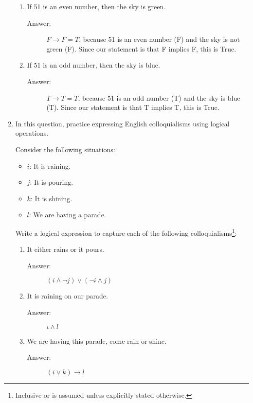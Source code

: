 \documentclass[12pt, oneside]{article}
\begin{document}
\begin{enumerate}
\begin{enumerate}
    \item If 51 is an even number, then the sky is green.
    \begin{description}
        \item[Answer:] $F \rightarrow F = T$, because 51 is an even number (F) and the sky is not green (F). Since our statement is that F implies F, this is True.
    \end{description}
    \item If 51 is an odd number, then the sky is blue.
    \begin{description}
        \item[Answer:] $T \rightarrow T = T$, because 51 is an odd number (T) and the sky is blue (T). Since our statement is that T implies T, this is True.
    \end{description}
\end{enumerate}


\item In this question, practice expressing English colloquialisms using logical operations.

Consider the following situations:
\begin{itemize}
    \item $i$: It is raining.
    \item $j$: It is pouring.
    \item $k$: It is shining.
    \item $l$: We are having a parade.

\end{itemize}

Write a logical expression to capture each of the following colloquialisms\footnote{Inclusive or is assumed unless explicitly stated otherwise.}:%
\begin{enumerate} %

    \item It either rains or it pours. 
    \begin{description}
        \item[Answer:] $(i \land \lnot j) \lor (\lnot i \land j)$
    \end{description}
    \item It is raining on our parade. 
    \begin{description}
        \item[Answer:] $i \land l$
    \end{description}
    \item We are having this parade, come rain or shine. 
    \begin{description}
        \item[Answer:] $(i \lor k) \rightarrow l$
    \end{description}



\end{enumerate}
\end{enumerate}
\end{document}
